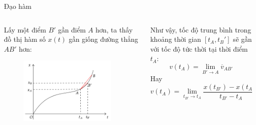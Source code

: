 \begin{frame}{Đạo hàm}
\begin{columns}
    \begin{column}{0.5\textwidth}
Lấy một điểm \(B'\) gần điểm \(A\) hơn, ta thấy đồ thị hàm số \(x(t)\) gần giống đường thẳng \(AB'\) hơn:
\begin{figure}
    \centering
    \includegraphics[width=0.9\textwidth]{Slides/figure/toc do tuc thoi.png}
\end{figure}
\end{column}
    \begin{column}{0.5\textwidth}
Như vậy, tốc độ trung bình trong khoảng thời gian \([t_A, t_B']\) sẽ gần với tốc độ tức thời tại thời điểm \(t_A\):
\begin{equation}
    v(t_A)=\lim_{B'\to A}\overline{v}_{AB'}
\end{equation}
Hay
\begin{equation}
    v(t_A)=\lim_{t_{B'} \to t_A}\dfrac{x(t_{B'})-x(t_A)}{t_{B'}-t_A}=x'(t_A)
\end{equation}
    \end{column}
\end{columns}
\end{frame}

